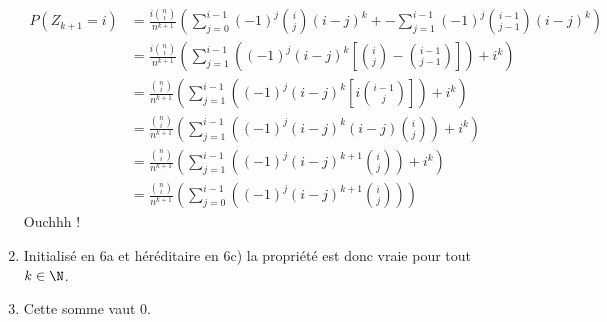 \begin{correction}
\begin{enumerate}
\begin{align*}
P(Z_{k+1} = i) &=   \frac{i\binom{n}{i}}{n^{k+1}} \left(\sum_{j=0}^{i-1} (-1)^j \binom{i}{j}(i-j)^k  +
- \sum_{j=1}^{i-1} (-1)^j \binom{i-1}{j-1}(i-j)^k
\right) \\
&= \frac{i\binom{n}{i}}{n^{k+1}} \left( 
 \sum_{j=1}^{i-1} \left( (-1)^j (i-j)^k\left[ \binom{i}{j} - \binom{i-1}{j-1} \right]\right) +i^k
\right) \\
&= \frac{\binom{n}{i}}{n^{k+1}} \left( 
 \sum_{j=1}^{i-1} \left((-1)^j (i-j)^k\left[i \binom{i-1}{j}\right] \right)+i^k
\right) \\
&= \frac{\binom{n}{i}}{n^{k+1}} \left( 
 \sum_{j=1}^{i-1} \left((-1)^j (i-j)^k (i-j) \binom{i}{j} \right)+i^k
\right) \\
&= \frac{\binom{n}{i}}{n^{k+1}} \left( 
 \sum_{j=1}^{i-1} \left((-1)^j (i-j)^{k+1}  \binom{i}{j} \right)+i^k
\right) \\
&= \frac{\binom{n}{i}}{n^{k+1}} \left( 
 \sum_{j=0}^{i-1} \left((-1)^j (i-j)^{k+1}  \binom{i}{j} \right)
\right) 
\end{align*}
Ouchhh !
 



\item Initialisé en 6a et héréditaire en 6c) la propriété est donc vraie pour tout $k\in \N$. 
\item Cette somme vaut 0. 
\end{enumerate}
\end{correction}
